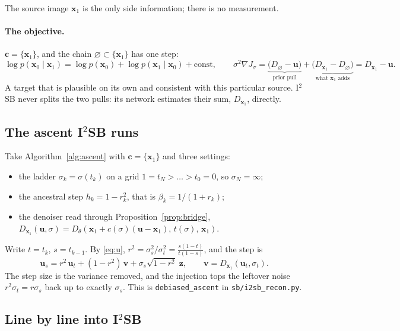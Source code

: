 \documentclass[11pt]{article}
\theoremstyle{remark}
\newcommand{\x}{\bm{x}}
\newcommand{\uu}{\bm{u}}
\newcommand{\vv}{\bm{v}}
\newcommand{\zz}{\bm{z}}
\newcommand{\cc}{\bm{c}}
\newcommand{\grad}{\nabla}
\newcommand{\code}[1]{\texttt{#1}}
\newcommand{\D}{D_\theta}
\newcommand{\Dz}{D_{\varnothing}}
\newcommand{\Dg}{D_{\x_1}}
\begin{document}
The source image $\x_1$ is the only side information; there is no measurement.

\paragraph{The objective.} $\cc = \{\x_1\}$, and the chain $\varnothing\subset\{\x_1\}$ has one
step:
\[
  \log p(\x_0\mid\x_1) = \log p(\x_0) + \log p(\x_1\mid\x_0) + \mathrm{const},
  \qquad
  \sigma^2\grad J_\sigma
  = \underbrace{\big(\Dz - \uu\big)}_{\text{prior pull}}
  + \underbrace{\big(\Dg - \Dz\big)}_{\text{what } \x_1 \text{ adds}}
  = \Dg - \uu .
\]
A target that is plausible on its own and consistent with this particular source. I$^2$SB never
splits the two pulls: its network estimates their sum, $\Dg$, directly.

\subsection{The ascent I\texorpdfstring{$^2$}{2}SB runs}

Take Algorithm~\ref{alg:ascent} with $\cc=\{\x_1\}$ and three settings:
\begin{itemize}[leftmargin=1.5em, itemsep=1pt]
  \item the ladder $\sigma_k=\sigma(t_k)$ on a grid $1=t_N>\dots>t_0=0$, so $\sigma_N=\infty$;
  \item the ancestral step $h_k = 1-r_k^2$, that is $\beta_k = 1/(1+r_k)$;
  \item the denoiser read through Proposition~\ref{prop:bridge},
        $\Dg(\uu,\sigma) = \D(\x_1 + c(\sigma)(\uu-\x_1),\,t(\sigma),\,\x_1)$.
\end{itemize}
Write $t=t_k$, $s=t_{k-1}$. By \eqref{eq:u}, $r^2 = \sigma_s^2/\sigma_t^2 = \frac{s(1-t)}{t(1-s)}$,
and the step is
\begin{equation}
  \uu_s = r^2\,\uu_t + (1-r^2)\,\vv + \sigma_s\sqrt{1-r^2}\;\zz,\qquad
  \vv = \Dg(\uu_t,\sigma_t).
  \label{eq:ustep}
\end{equation}
The step size is the variance removed, and the injection tops the leftover noise
$r^2\sigma_t = r\sigma_s$ back up to exactly $\sigma_s$. This is \code{debiased\_ascent} in
\code{sb/i2sb\_recon.py}.

\subsection{Line by line into I\texorpdfstring{$^2$}{2}SB}
\end{document}
